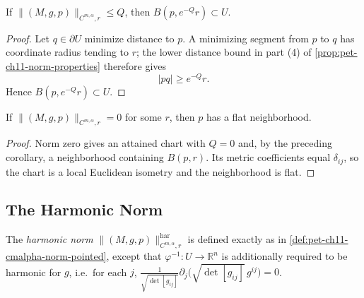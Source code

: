 \begin{corollary}
  \label{cor:pet-ch11-norm-bound-ball-containment}
  If $\|(M,g,p)\|_{C^{m,\alpha},r}\le Q$, then $B(p,e^{-Q}r)\subset U$.
\end{corollary}
\begin{proof}
  \sketch
  Let \(q\in\partial U\) minimize distance to \(p\). A minimizing segment from \(p\) to \(q\) has coordinate radius tending to \(r\); the lower distance bound in part (4) of \cref{prop:pet-ch11-norm-properties} therefore gives
  \[
    |pq|\ge e^{-Q}r.
  \]
  Hence \(B(p,e^{-Q}r)\subset U\).
\end{proof}


\begin{corollary}
  \label{cor:pet-ch11-norm-zero-implies-flat}
  If $\|(M,g,p)\|_{C^{m,\alpha},r}=0$ for some $r$, then $p$ has a flat
  neighborhood.
\end{corollary}
\begin{proof}
  \sketch
  Norm zero gives an attained chart with \(Q=0\) and, by the preceding corollary, a neighborhood containing \(B(p,r)\). Its metric coefficients equal \(\delta_{ij}\), so the chart is a local Euclidean isometry and the neighborhood is flat.
\end{proof}


\subsection{The Harmonic Norm}

\begin{definition}
  \label{def:pet-ch11-harmonic-norm}
  The \emph{harmonic norm} $\|(M,g,p)\|^{\mathrm{har}}_{C^{m,\alpha},r}$ is
  defined exactly as in \cref{def:pet-ch11-cmalpha-norm-pointed}, except that
  $\varphi^{-1}:U\to\mathbb{R}^n$ is additionally required to be harmonic for
  $g$, i.e.\ for each $j$,
  $\frac1{\sqrt{\det[g_{ij}]}}\partial_j\big(\sqrt{\det[g_{ij}]}\,g^{ij}\big)=0$.
\end{definition}

